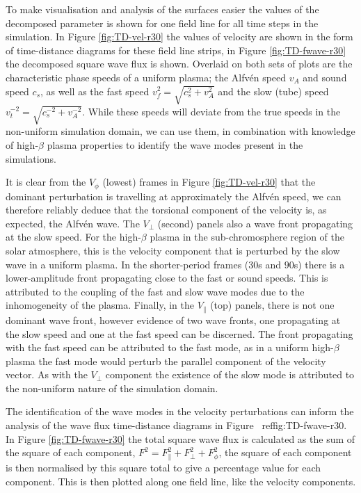 To make visualisation and analysis of the surfaces easier the values of the decomposed parameter is shown for one field line for all time steps in the simulation.
In Figure \ref{fig:TD-vel-r30} the values of velocity are shown in the form of time-distance diagrams for these field line strips, in Figure \ref{fig:TD-fwave-r30} the decomposed square wave flux is shown. Overlaid on both sets of plots are the characteristic phase speeds of a uniform plasma; the Alfv\'en speed $v_A$ and sound speed $c_s$, as well as the fast speed $v_f^2 = \sqrt{c_s^2 + v_A^2}$ and the slow (tube) speed $v_t^{-2} = \sqrt{c_s^{-2} + v_A^{-2}}$.
While these speeds will deviate from the true speeds in the non-uniform simulation domain, we can use them, in combination with knowledge of high-$\beta$ plasma properties to identify the wave modes present in the simulations.


It is clear from the $V_\phi$ (lowest) frames in Figure \ref{fig:TD-vel-r30} that the dominant perturbation is travelling at approximately the Alfv\'en speed, we can therefore reliably deduce that the torsional component of the velocity is, as expected, the Alfv\'en wave.
The $V_\perp$ (second) panels also a wave front propagating at the slow speed. For the high-$\beta$ plasma in the sub-chromosphere region of the solar atmosphere, this is the velocity component that is perturbed by the slow wave in a uniform plasma. In the shorter-period frames ($30$s and $90$s) there is a lower-amplitude front propagating close to the fast or sound speeds.
This is attributed to the coupling of the fast and slow wave modes due to the inhomogeneity of the plasma.
Finally, in the $V_\parallel$ (top) panels, there is not one dominant wave front, however evidence of two wave fronts, one propagating at the slow speed and one at the fast speed can be discerned.
The front propagating with the fast speed can be attributed to the fast mode, as in a uniform high-$\beta$ plasma the fast mode would perturb the parallel component of the velocity vector.
As with the $V_\perp$ component the existence of the slow mode is attributed to the non-uniform nature of the simulation domain.


The identification of the wave modes in the velocity perturbations can inform the analysis of the wave flux time-distance diagrams in Figure \
ref{fig:TD-fwave-r30}.
In Figure \ref{fig:TD-fwave-r30} the total square wave flux is calculated as the sum of the square of each component, $ F^2 = F_\parallel^2 + F_\perp ^2  + F_\phi^2$, the square of each component is then normalised by this square total to give a percentage value for each component.
This is then plotted along one field line, like the velocity components.


